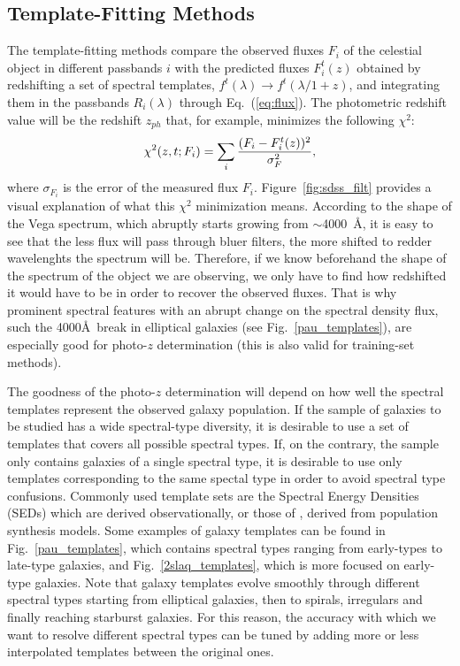 \subsection{Template-Fitting Methods}
The template-fitting methods compare the observed fluxes $F_i$ of the celestial object in different passbands $i$ with the predicted fluxes $F_i^t(z)$ obtained by redshifting a set of spectral templates, $f^t(\lambda) \rightarrow f^t(\lambda/1+z)$, and integrating them in the passbands $R_i(\lambda)$ through Eq.~(\ref{eq:flux}). The photometric redshift value will be the redshift $z_{ph}$ that, for example, minimizes the following $\chi^2$:
\begin{equation}
\chi^2(z,t; F_i)=\sum_i {(F_i -  F_i^t(z))^2 \over  \sigma_F^2},
\end{equation}
where $\sigma_{F_i}$ is the error of the measured flux $F_i$. Figure~\ref{fig:sdss_filt} provides a visual explanation of what this $\chi^2$ minimization means. According to the shape of the Vega spectrum, which abruptly starts growing from $\sim$4000~\AA, it is easy to see that the less flux will pass through bluer filters, the more shifted to redder wavelenghts the spectrum will be. Therefore, if we know beforehand the shape of the spectrum of the object we are observing, we only have to find how redshifted it would have to be in order to recover the observed fluxes. That is why prominent spectral features with an abrupt change on the spectral density flux, such the 4000\AA \ break in elliptical galaxies (see Fig.~\ref{pau_templates}), are especially good for photo-$z$ determination (this is also valid for training-set methods).
 
The goodness of the photo-$z$ determination will depend on how well the spectral templates represent the observed galaxy population. If the sample of galaxies to be studied has a wide spectral-type diversity, it is desirable to use a set of templates that covers all possible spectral types. If, on the contrary, the sample only contains galaxies of a single spectral type, it is desirable to use only templates corresponding to the same spectal type in order to avoid spectral type confusions. Commonly used template sets are the \citet{Coleman1980} Spectral Energy Densities (SEDs) which are derived observationally, or those of \citet{Bruzual1993}, derived from population synthesis models. Some examples of galaxy templates can be found in Fig.~\ref{pau_templates}, which contains spectral types ranging from early-types to late-type galaxies, and Fig.~\ref{2slaq_templates}, which is more focused on early-type galaxies. Note that galaxy templates evolve smoothly through different spectral types starting from elliptical galaxies, then to spirals, irregulars and finally reaching starburst galaxies. For this reason, the accuracy with which we want to resolve different spectral types can be tuned by adding more or less interpolated templates between the original ones.


